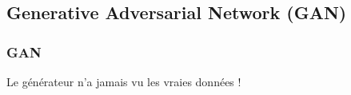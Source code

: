 \subsection{Generative Adversarial Network (\textbf{GAN})}



\begin{frame}
  \frametitle{GAN}
  Le générateur n'a jamais vu les vraies données !
\end{frame}

